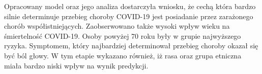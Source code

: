\documentclass[polish, twoside, 12pt, a4paper]{article}
\theoremstyle{definition}
\theoremstyle{plain}
\theoremstyle{remark}
\begin{document}
Opracowany model oraz jego analiza dostarczyła wniosku, że cechą która bardzo silnie determinuje przebieg choroby COVID-19 jest posiadanie przez zarażonego chorób współistniejących. Zaobserwowano także wysoki wpływ wieku na śmiertelność COVID-19. Osoby powyżej 70 roku były w grupie najwyższego ryzyka. Symptomem, który najbardziej determinował przebieg choroby okazał się być ból głowy. W tym etapie wykazano również, iż rasa oraz grupa etniczna miała bardzo niski wpływ na wynik predykcji.
\end{document}
